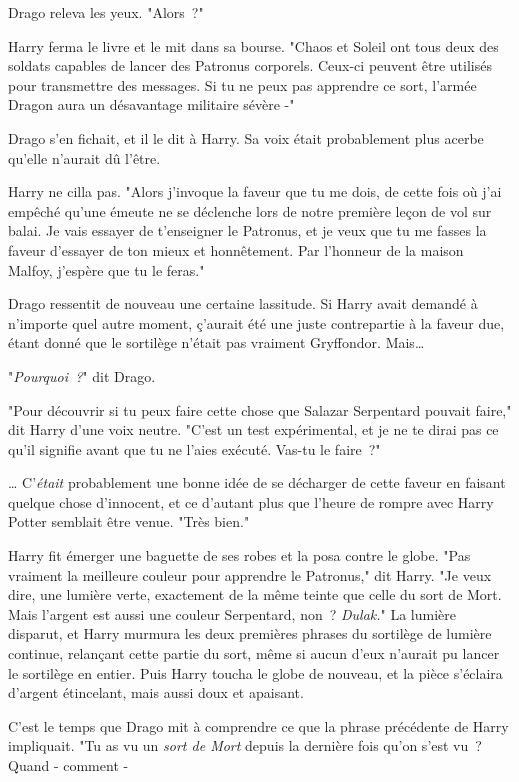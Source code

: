 Drago releva les yeux. "Alors~?"

Harry ferma le livre et le mit dans sa bourse. "Chaos et Soleil ont tous deux des soldats capables de lancer des Patronus corporels. Ceux-ci peuvent être utilisés pour transmettre des messages. Si tu ne peux pas apprendre ce sort, l'armée Dragon aura un désavantage militaire sévère -"

Drago s'en fichait, et il le dit à Harry. Sa voix était probablement plus acerbe qu'elle n'aurait dû l'être.

Harry ne cilla pas. "Alors j'invoque la faveur que tu me dois, de cette fois où j'ai empêché qu'une émeute ne se déclenche lors de notre première leçon de vol sur balai. Je vais essayer de t'enseigner le Patronus, et je veux que tu me fasses la faveur d'essayer de ton mieux et honnêtement. Par l'honneur de la maison Malfoy, j'espère que tu le feras."

Drago ressentit de nouveau une certaine lassitude. Si Harry avait demandé à n'importe quel autre moment, ç'aurait été une juste contrepartie à la faveur due, étant donné que le sortilège n'était pas vraiment Gryffondor. Mais…

"\emph{Pourquoi~?}" dit Drago.

"Pour découvrir si tu peux faire cette chose que Salazar Serpentard pouvait faire," dit Harry d'une voix neutre. "C'est un test expérimental, et je ne te dirai pas ce qu'il signifie avant que tu ne l'aies exécuté. Vas-tu le faire~?"

… C'\emph{était} probablement une bonne idée de se décharger de cette faveur en faisant quelque chose d'innocent, et ce d'autant plus que l'heure de rompre avec Harry Potter semblait être venue. "Très bien."

Harry fit émerger une baguette de ses robes et la posa contre le globe. "Pas vraiment la meilleure couleur pour apprendre le Patronus," dit Harry. "Je veux dire, une lumière verte, exactement de la même teinte que celle du sort de Mort. Mais l'argent est aussi une couleur Serpentard, non~? \emph{Dulak.}" La lumière disparut, et Harry murmura les deux premières phrases du sortilège de lumière continue, relançant cette partie du sort, même si aucun d'eux n'aurait pu lancer le sortilège en entier. Puis Harry toucha le globe de nouveau, et la pièce s'éclaira d'argent étincelant, mais aussi doux et apaisant.

C'est le temps que Drago mit à comprendre ce que la phrase précédente de Harry impliquait. "Tu as vu un \emph{sort de Mort} depuis la dernière fois qu'on s'est vu~? Quand - comment -

